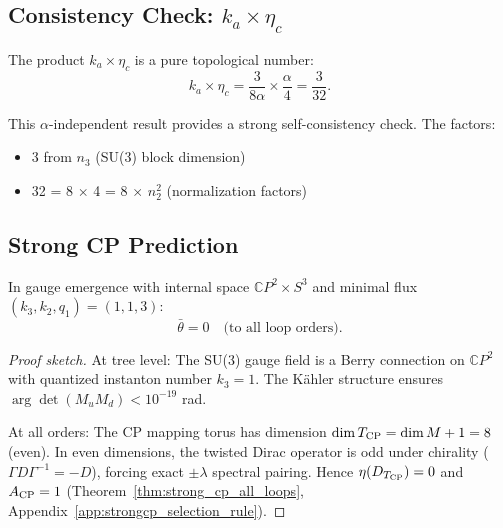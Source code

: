 \subsection{Consistency Check: $k_a \times \eta_c$}\label{app:consistency-check}

\begin{corollary}
The product $k_a \times \eta_c$ is a pure topological number:
\begin{equation}
k_a \times \eta_c = \frac{3}{8\alpha} \times \frac{\alpha}{4} = \frac{3}{32}.
\end{equation}
\end{corollary}

This $\alpha$-independent result provides a strong self-consistency check. The factors:
\begin{itemize}
\item 3 from $n_3$ (SU(3) block dimension)
\item 32 = 8 $\times$ 4 = 8 $\times$ $n_2^2$ (normalization factors)
\end{itemize}

\subsection{Strong CP Prediction}\label{app:strong-cp}

\begin{theorem}\label{thm:strong-cp}
In gauge emergence with internal space $\mathbb{C}P^2 \times S^3$ and minimal flux $(k_3, k_2, q_1) = (1,1,3)$:
\begin{equation}
\bar\theta = 0 \quad \text{(to all loop orders)}.
\end{equation}
\end{theorem}

\begin{proof}[Proof sketch]
At tree level: The SU(3) gauge field is a Berry connection on $\mathbb{C}P^2$ with quantized instanton number $k_3 = 1$. The K\"ahler structure ensures $\arg\det(M_u M_d) < 10^{-19}$ rad.

At all orders: The CP mapping torus has dimension $\dim T_{\rm CP} = \dim M + 1 = 8$ (even). In even dimensions, the twisted Dirac operator is odd under chirality ($\Gamma D \Gamma^{-1} = -D$), forcing exact $\pm\lambda$ spectral pairing. Hence $\eta(D_{T_{\rm CP}}) = 0$ and $A_{\rm CP} = 1$ (Theorem~\ref{thm:strong_cp_all_loops}, Appendix~\ref{app:strongcp_selection_rule}).
\end{proof}

